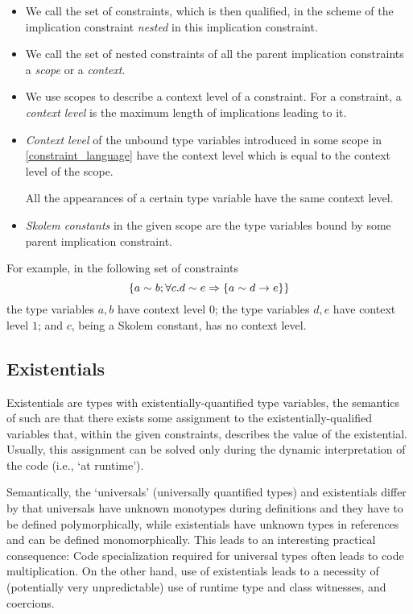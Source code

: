 \begin{defn}[Naming]
    \begin{itemize}
        \item We call the set of constraints, which is then qualified, in the scheme of the implication constraint \emph{nested} in this implication constraint.

        \item We call the set of nested constraints of all the parent implication constraints a \emph{scope} or a \emph{context}.

        \item We use scopes to describe a context level of a constraint. For a constraint, a \emph{context level} is the maximum length of implications leading to it.

        \item \emph{Context level} of the unbound type variables introduced in some scope in \cref{constraint_language} have the context level which is equal to the context level of the scope.

        All the appearances of a certain type variable have the same context level.

        \item \emph{Skolem constants} in the given scope are the type variables bound by some parent implication constraint.
    \end{itemize}
\end{defn}

For example, in the following set of constraints
\[ \left\{ a \sim b; \forall c. d \sim e \Rightarrow \left\{ a \sim d \to e \right\} \right\} \]
the type variables $a, b$ have context level $0$; the type variables $d, e$ have context level $1$; and $c$, being a Skolem constant, has no context level.

\subsection{Existentials}

\label{existentials}

Existentials are types with existentially-quantified type variables, the semantics of such are that there exists some assignment to the existentially-qualified variables that, within the given constraints, describes the value of the existential. Usually, this assignment can be solved only during the dynamic interpretation of the code (i.e., `at runtime').

Semantically, the `universals' (universally quantified types) and existentials differ by that universals have unknown monotypes during definitions and they have to be defined polymorphically, while existentials have unknown types in references and can be defined monomorphically. This leads to an interesting practical consequence: Code specialization required for universal types often leads to code multiplication. On the other hand, use of existentials leads to a necessity of (potentially very unpredictable) use of runtime type and class witnesses, and coercions.

